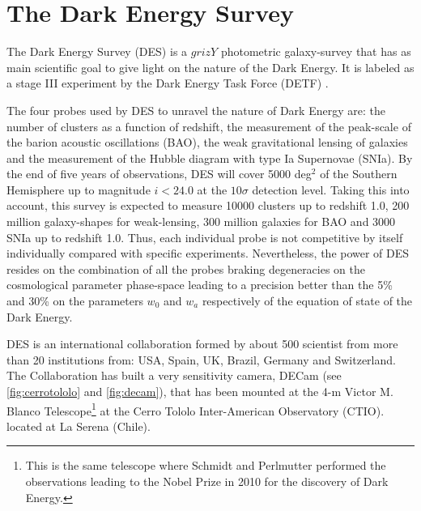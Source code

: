 \chapter{The Dark Energy Survey}

The Dark Energy Survey (DES) \cite{2005astro.ph.10346T} is a $grizY$ photometric galaxy-survey that has as main scientific goal to give light on the nature of the Dark Energy. It is labeled as a stage III experiment by the Dark Energy Task Force (DETF) \cite{2006astro.ph..9591A}.
\newline

The four probes used by DES to unravel the nature of Dark Energy are: the number of clusters as a function of redshift, the measurement of the peak-scale of the barion acoustic oscillations (BAO), the weak gravitational lensing of galaxies and the measurement of the Hubble diagram with type Ia Supernovae (SNIa). By the end of five years of observations, DES will cover 5000 deg$^2$ of the Southern Hemisphere up to magnitude $i<24.0$ at the $10\sigma$ detection level. Taking this into account, this survey is expected to measure 10000 clusters up to redshift 1.0, 200 million galaxy-shapes for weak-lensing, 300 million galaxies for BAO and 3000 SNIa up to redshift 1.0. Thus, each individual probe is not competitive by itself individually compared with specific experiments. Nevertheless, the power of DES resides on the combination of all the probes braking degeneracies on the cosmological parameter phase-space leading to a precision better than the 5\% and 30\% on the parameters $w_0$ and $w_a$ respectively of the equation of state of the Dark Energy.
\newline

DES is an international collaboration formed by about 500 scientist from more than 20 institutions from: USA, Spain, UK, Brazil, Germany and Switzerland. The Collaboration has built a very sensitivity camera, DECam (see \autoref{fig:cerrotololo} and \autoref{fig:decam}), that has been mounted at the 4-m Victor M. Blanco Telescope\footnote{This is the same telescope where Schmidt and Perlmutter performed the observations leading to the Nobel Prize in 2010 for the discovery of Dark Energy.} at the Cerro Tololo Inter-American Observatory (CTIO). located at La Serena (Chile).

